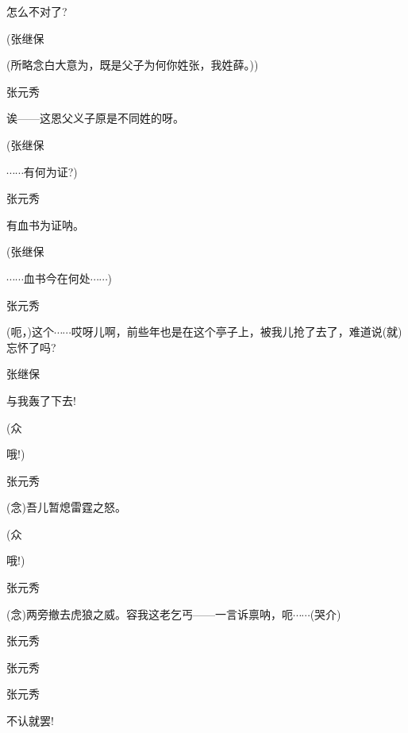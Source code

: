 怎么不对了?

(张继保\hspace{20pt}~

(所略念白大意为，既是父子为何你姓张，我姓薛。))

张元秀\hspace{20pt}~

诶------这恩父义子原是不同姓的呀。

(张继保\hspace{20pt}~

$\cdots{}\cdots{}$有何为证?)

张元秀\hspace{20pt}~

有血书为证呐。

(张继保\hspace{20pt}~

$\cdots{}\cdots{}$血书今在何处$\cdots{}\cdots{}$)

张元秀

(呃，)这个$\cdots{}\cdots{}$哎呀儿啊，前些年也是在这个亭子上，被我儿抢了去了，难道说(就)忘怀了吗?

张继保\hspace{20pt}~

与我轰了下去!

(众\hspace{40pt}~

哦!)

张元秀\hspace{20pt}~

({\akai 念})吾儿暂熄雷霆之怒。

(众\hspace{40pt}~

哦!)

张元秀

({\akai 念})两旁撤去虎狼之威。容我这老乞丐------一言诉禀呐，呃$\cdots{}\cdots{}$(哭介)

张元秀


张元秀\hspace{20pt}~


张元秀\hspace{20pt}~

不认就罢!

